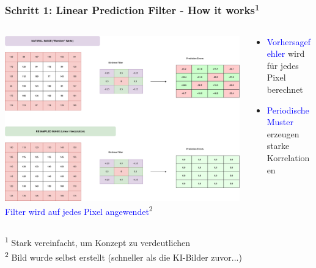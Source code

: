 \documentclass[11pt,t,usepdftitle=false,aspectratio=169]{beamer}
\begin{document}
\begin{frame}
	\frametitle{Schritt 1: Linear Prediction Filter - How it works\textsuperscript{1}}

	\begin{columns}[T]
		\begin{column}{0.60\textwidth}
			\includegraphics[width=\textwidth]{images/apply_filter.png}
			\textcolor{blue}{\small Filter wird auf jedes Pixel angewendet}\textsuperscript{2}
		\end{column}
		\begin{column}{0.38\textwidth}
			\begin{itemize}
				\item \textcolor{blue}{Vorhersagefehler} wird für jedes Pixel berechnet
				\item \textcolor{blue}{Periodische Muster} erzeugen starke Korrelationen
			\end{itemize}
		\end{column}			
	\end{columns}

	\vspace{-1.5em}
	\hfill \begin{minipage}{0.38\textwidth}
		\begin{footnotesize}
			\textsuperscript{1} Stark vereinfacht, um Konzept zu verdeutlichen\\
			\textsuperscript{2} Bild wurde selbst erstellt (schneller als die KI-Bilder zuvor...)
		\end{footnotesize}
	\end{minipage}
\end{frame}
\end{document}
